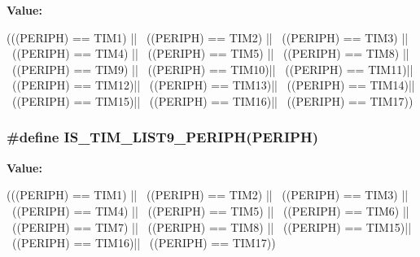 \label{group__TIM__Exported__constants_ga120d98895bd48d628028753212b68233}
{\bfseries Value:}
\begin{DoxyCode}
(((PERIPH) == TIM1) || \
                                      ((PERIPH) == TIM2) || \
                                      ((PERIPH) == TIM3) || \
                                      ((PERIPH) == TIM4) || \
                                      ((PERIPH) == TIM5) || \
                                      ((PERIPH) == TIM8) || \
                                      ((PERIPH) == TIM9) || \
                                      ((PERIPH) == TIM10)|| \
                                      ((PERIPH) == TIM11)|| \
                                      ((PERIPH) == TIM12)|| \
                                      ((PERIPH) == TIM13)|| \
                                      ((PERIPH) == TIM14)|| \
                                      ((PERIPH) == TIM15)|| \
                                      ((PERIPH) == TIM16)|| \
                                      ((PERIPH) == TIM17))
\end{DoxyCode}
\hypertarget{group__TIM__Exported__constants_ga24ff46311f2d074ec6bd93f2972d1d9b}{
\subsubsection[{IS\_\-TIM\_\-LIST9\_\-PERIPH}]{\setlength{\rightskip}{0pt plus 5cm}\#define IS\_\-TIM\_\-LIST9\_\-PERIPH(PERIPH)}}
\label{group__TIM__Exported__constants_ga24ff46311f2d074ec6bd93f2972d1d9b}
{\bfseries Value:}
\begin{DoxyCode}
(((PERIPH) == TIM1) || \
                                      ((PERIPH) == TIM2) || \
                                      ((PERIPH) == TIM3) || \
                                      ((PERIPH) == TIM4) || \
                                      ((PERIPH) == TIM5) || \
                                      ((PERIPH) == TIM6) || \
                                      ((PERIPH) == TIM7) || \
                                      ((PERIPH) == TIM8) || \
                                      ((PERIPH) == TIM15)|| \
                                      ((PERIPH) == TIM16)|| \
                                      ((PERIPH) == TIM17))
\end{DoxyCode}
